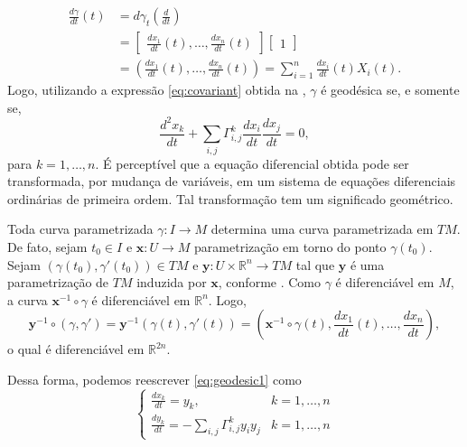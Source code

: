 \begin{align*}
    \frac{d\gamma}{dt}(t) & =d\gamma_{t}\left( \frac{d}{dt} \right)                                                                                               \\
                          & =\begin{bmatrix}
                                 \frac{dx_{1}}{dt}(t), \dots, \frac{dx_{n}}{dt}(t)
                             \end{bmatrix}
    \begin{bmatrix}
        1
    \end{bmatrix}                                                                                                                                                \\
                          & =\left( \frac{dx_{1}}{dt}(t), \dots, \frac{dx_{n}}{dt}(t) \right)                       = \sum_{i=1}^{n}\frac{dx_{i}}{dt}(t)X_{i}(t).
\end{align*}
Logo, utilizando a expressão \eqref{eq:covariant} obtida na , $\gamma$ é geodésica se, e somente se,
\begin{equation}
    \label{eq:geodesic1}
    \frac{d^{2}x_{k}}{dt}+\sum_{i,j}\Gamma_{i,j}^{k}\frac{dx_{i}}{dt}\frac{dx_{j}}{dt}=0,
\end{equation}
para $k =1, \dots, n$.
É perceptível que a equação diferencial obtida pode ser transformada, por mudança de variáveis, em um sistema de equações diferenciais ordinárias de primeira ordem. Tal transformação tem um significado geométrico.
\begin{observation}
    \label{obs:geodesica-no-fibrado}
    Toda curva parametrizada $\gamma:I\to M$ determina uma curva parametrizada em $TM$.
    De fato, sejam $t_{0} \in I$ e $\mathbf{x}:U\to M$ parametrização em torno do ponto $\gamma(t_{0})$. Sejam $(\gamma(t_{0}),\gamma'(t_{0})) \in TM$ e $\mathbf{y}:U\times \mathbb{R}^{n}\to TM$ tal que $\mathbf{y}$ é uma parametrização de $TM$ induzida por $\mathbf{x}$, conforme \textcite[p.~15, ex.~4.1]{doCarmo1992}. Como $\gamma$ é diferenciável em $M$, a curva $\mathbf{x}^{-1} \circ \gamma$ é diferenciável em $\mathbb{R}^{n}$. Logo,
    \begin{equation*}
        \mathbf{y}^{-1} \circ (\gamma, \gamma')=\mathbf{y}^{-1}(\gamma(t),\gamma'(t))=\left( \mathbf{x}^{-1}\circ \gamma(t), \frac{dx_{1}}{dt}(t), \dots,\frac{dx_{n}}{dt} \right),
    \end{equation*}
    o qual é diferenciável em $\mathbb{R}^{2n}$.

    Dessa forma, podemos reescrever \eqref{eq:geodesic1} como
    \begin{equation}
        \begin{cases}
            \label{eq:geodesic2}
            \frac{dx_{k}}{dt}=y_{k},                                & k=1, \dots, n \\
            \frac{dy_{k}}{dt}=-\sum_{i,j}\Gamma_{i,j}^{k}y_{i}y_{j} & k=1, \dots, n
        \end{cases}
    \end{equation}
\end{observation}
